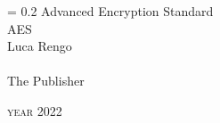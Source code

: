 \documentclass[a4paper,12pt]{book}
\newlength{\drop}
\newcommand*{\titleRF}{\begingroup%
	\drop = 0.2\textheight
	\vfill
	{\Huge Advanced Encryption Standard}\\[\baselineskip]
	{\Huge AES}\\[\baselineskip]
	{\large Luca Rengo}\\[0.5\drop]
	{\Large }\\[0.5\baselineskip] %
	{\Large The Publisher}\par %
	{\large \scshape year 2022} 
	\vfill\null
	\endgroup}
\begin{document}
	
	\frontmatter
	
	\titleRF
	
	\tableofcontents
	
	
	
	
	\mainmatter
	
	
	
	
	
	
	
	
	
	\backmatter
	
\end{document}

